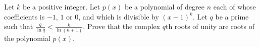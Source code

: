 \documentclass{article}
\begin{document}
\setlength{\parindent}{0pt}
Let $k$ be a positive integer. Let $p(x)$ be a polynomial of degree $n$ each of whose coefficients is $-1$, $1$ or $0$, and which is divisible by $(x-1)^{k}$. Let $q$ be a prime such that $\frac{q}{\ln q}<\frac{k}{\ln(n+1)}$. Prove that the complex $q$th roots of unity are roots of the polynomial $p(x)$.
\end{document}
